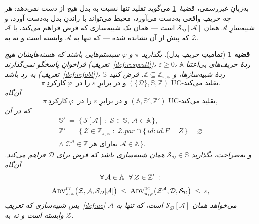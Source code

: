 \documentclass[10pt,oneside,openany]{book}
\renewcommand{\emptyset}{\varnothing}
\newcommand{\pars}{\mathit{par}}
\newcommand{\Zenv}{\mathcal{Z}}
\newcommand{\Adv}{\mathcal{A}}
\newcommand{\Dum}{\mathcal{D}}
\newcommand{\Sim}{\mathcal{S}}
\newcommand{\advtg}{\op{Adv}}
\newcommand{\Aset}{\mathbb{A}}
\newcommand{\SimSet}{\mathbb{S}}
\newcommand{\ZenvSet}{\mathbb{Z}}
\newcommand{\op}[1]{\textnormal{\textsc{#1}}}
\newcommand{\id}{id}
\theoremstyle{accentdef}
\theoremstyle{accentplain}
\newtheorem{theorem}[definition]{قضیه}
\begin{document}
به‌زبانِ غیررسمی، قضیهٔ~\ref{thm:dummy} می‌گوید تقلید تنها نسبت به بدل هیچ
از دست نمی‌دهد: هر چه حریفِ واقعی به‌دست می‌آورد، محیط می‌تواند با راندنِ
بدل به‌دست آورد، و شبیه‌سازِ $\Adv$ همان $\Sim_{\Dum}[\Adv]$ است ---
همان یک شبیه‌سازی که فرض فراهم می‌کند، با $\Adv$ که پیش از آن نشانده شده
--- که تنها به $\Adv$ وابسته است و نه به $\Zenv$.

\begin{theorem}[تمامیتِ حریفِ بدل]\label{thm:dummy}
بگذارید $\pi$ و $\varphi$ سیستم‌هایی باشند که هسته‌هایشان هیچ فراخوانِ
پاسخگو نمی‌گذارند (تعریفِ~\ref{def:respcall})، $\varepsilon \geq 0$،
$\Aset$ ردهٔ حریف‌های بی‌اعتنا به رد باشد
(تعریفِ~\ref{def:refobl})، $\SimSet$ ردهٔ شبیه‌سازها، و $\ZenvSet \subseteq
\ZenvSet_{\pi,\varphi}$. فرض کنید
\[
  \pi \ \text{کارکردِ} \ \varphi \ \text{ را در } \varepsilon \text{ و در برابرِ } (\{\Dum\},\SimSet,\ZenvSet) \text{ UC-تقلید می‌کند} .
\]
آن‌گاه
\[
  \pi \ \text{کارکردِ} \ \varphi \ \text{ را در } \varepsilon \text{ و در برابرِ } (\Aset,\SimSet',\ZenvSet') \text{ UC-تقلید می‌کند} ,
\]
که در آن
\begin{gather*}
  \SimSet' \;=\; \bigl\{\, \Sim[\Adv] \;:\; \Sim \in \SimSet,\ \Adv \in \Aset \,\bigr\},
  \\
  \ZenvSet' \;=\; \bigl\{\, \Zenv \in \ZenvSet_{\pi,\varphi} \;:\;
  \Zenv.\pars \cap \{\, \id : \id.F = Z \,\} = \emptyset \\
  \wedge\ \Zenv^{\Adv} \in \ZenvSet \ \text{به‌ازای هر } \Adv \in \Aset \,\bigr\} .
\end{gather*}
و به‌صراحت، بگذارید $\Sim_{\Dum} \in \SimSet$ همان شبیه‌سازی باشد که فرض
برای $\Dum$ فراهم می‌کند. آن‌گاه
\[
  \begin{gathered}
  \forall\, \Adv \in \Aset \ \ \forall\, \Zenv \in \ZenvSet' \ : \\[3pt]
  \advtg^{\op{uc}}_{\pi,\varphi}\bigl(\Zenv,\Adv,\Sim_{\Dum}[\Adv]\bigr)
  \;\leq\;
  \advtg^{\op{uc}}_{\pi,\varphi}\bigl(\Zenv^{\Adv},\Dum,\Sim_{\Dum}\bigr)
  \;\leq\; \varepsilon ,
  \end{gathered}
\]
پس شبیه‌سازی که تعریفِ~\ref{def:uc} می‌خواهد همان $\Sim_{\Dum}[\Adv]$ است،
که تنها به $\Adv$ وابسته است و نه به $\Zenv$.
\end{theorem}
\end{document}
